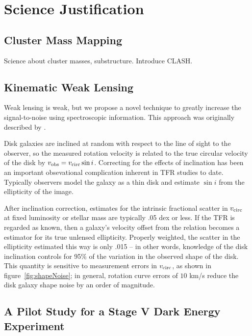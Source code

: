 \documentclass[11pt,preprint]{aastex}
\begin{document}

\section{Science Justification}

\subsection{Cluster Mass Mapping}
Science about cluster masses, substructure. Introduce CLASH.

\subsection{Kinematic Weak Lensing}

Weak lensing is weak, but we propose a novel technique to greatly increase the signal-to-noise using spectroscopic information. This approach was originally described by \citet{Blain2002, Morales2006}.

Disk galaxies are inclined at random with respect to the line of sight to the observer, so the measured rotation velocity is related to the true circular velocity of the disk by $v_{\rm obs} = v_{\rm circ} \sin i$. Correcting for the effects of inclination has been an important obsevational complication inherent in TFR studies to date. Typically observers model the galaxy as a thin disk and estimate $\sin i$ from the ellipticity of the image.

After inclination correction, estimates for the intrinsic fractional scatter in $v_{\rm circ}$ at fixed luminosity or stellar mass are typically .05 dex or less. If the TFR is regarded as known, then a galaxy's velocity offset from the relation becomes a estimator for its true unlensed ellipticity. Properly weighted, the scatter in the ellipticity estimated this way is only .015 -- in other words, knowledge of the disk inclination controls for 95\% of the variation in the observed shape of the disk. This quantity is sensitive to measurement errors in $v_{\rm circ}$, as shown in figure~\ref{fig:shapeNoise}; in general, rotation curve errors of $10 $ km/s reduce the disk galaxy shape noise by an order of magnitude.


\subsection{A Pilot Study for a Stage V Dark Energy Experiment}
\end{document}
